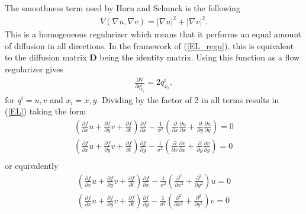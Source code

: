 \documentclass[10pt,a4paper]{article}
\begin{document}
The smoothness term used by Horn and Schunck is the following
\begin{align*}
V(\nabla u, \nabla v) = |\nabla u|^2 + |\nabla v|^2.
\end{align*}
This is a homogeneous regularizer which means that it performs an equal amount of diffusion in all directions. In the framework of (\ref{EL_regu}), this is equivalent to the diffusion matrix \textbf{D} being the identity matrix. Using this function as a flow regularizer gives
\begin{align*}
\frac{\partial V}{\partial q^i_{x_i}} = 2q^i_{x_i},
\end{align*}
for $q^i = u,v$ and $x_i = x, y$. Dividing by the factor of 2 in all terms results in (\ref{EL}) taking the form 
\begin{equation}
\label{EL_HS}
\begin{aligned}
(\frac{\partial f}{\partial x}u + \frac{\partial f}{\partial y}v + \frac{\partial f}{\partial t}) \frac{\partial f}{\partial x} - \frac{1}{\sigma^2}(\frac{\partial}{\partial x} \frac{\partial u}{\partial x} + \frac{\partial}{\partial y} \frac{\partial u}{\partial y} ) = 0 \\
(\frac{\partial f}{\partial x}u + \frac{\partial f}{\partial y}v + \frac{\partial f}{\partial t}) \frac{\partial f}{\partial y} - \frac{1}{\sigma^2}(\frac{\partial}{\partial x} \frac{\partial v}{\partial x} + \frac{\partial}{\partial y} \frac{\partial v}{\partial y} ) = 0 \\
\end{aligned}
\end{equation}
or equivalently
\begin{align*}
(\frac{\partial f}{\partial x}u + \frac{\partial f}{\partial y}v + \frac{\partial f}{\partial t}) \frac{\partial f}{\partial x} - \frac{1}{\sigma^2}(\frac{\partial^2}{\partial x^2} +  \frac{\partial^2}{\partial y^2} ) u = 0 \\
(\frac{\partial f}{\partial x}u + \frac{\partial f}{\partial y}v + \frac{\partial f}{\partial t}) \frac{\partial f}{\partial y} - \frac{1}{\sigma^2}(\frac{\partial^2}{\partial x^2} +  \frac{\partial^2}{\partial y^2}) v = 0 \\
\end{align*}
\end{document}
